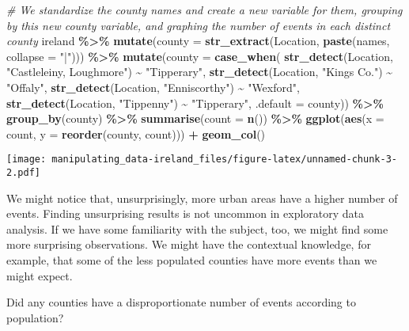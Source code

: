 \documentclass[
]{article}
\newenvironment{Shaded}{\begin{snugshade}}{\end{snugshade}}
\newcommand{\AttributeTok}[1]{\textcolor[rgb]{0.13,0.29,0.53}{#1}}
\newcommand{\CommentTok}[1]{\textcolor[rgb]{0.56,0.35,0.01}{\textit{#1}}}
\newcommand{\FunctionTok}[1]{\textcolor[rgb]{0.13,0.29,0.53}{\textbf{#1}}}
\newcommand{\NormalTok}[1]{#1}
\newcommand{\SpecialCharTok}[1]{\textcolor[rgb]{0.81,0.36,0.00}{\textbf{#1}}}
\newcommand{\StringTok}[1]{\textcolor[rgb]{0.31,0.60,0.02}{#1}}
\begin{document}
\begin{Shaded}
\begin{Highlighting}[]
\CommentTok{\# We standardize the county names and create a new variable for them, grouping by this new county variable, and graphing the number of events in each distinct county}
\NormalTok{ireland }\SpecialCharTok{\%\textgreater{}\%} 
  \FunctionTok{mutate}\NormalTok{(}\AttributeTok{county =} \FunctionTok{str\_extract}\NormalTok{(Location, }\FunctionTok{paste}\NormalTok{(names, }\AttributeTok{collapse =} \StringTok{"|"}\NormalTok{))) }\SpecialCharTok{\%\textgreater{}\%}
  \FunctionTok{mutate}\NormalTok{(}\AttributeTok{county =} \FunctionTok{case\_when}\NormalTok{(}
    \FunctionTok{str\_detect}\NormalTok{(Location, }\StringTok{"Castleleiny, Loughmore"}\NormalTok{) }\SpecialCharTok{\textasciitilde{}} \StringTok{"Tipperary"}\NormalTok{,}
    \FunctionTok{str\_detect}\NormalTok{(Location, }\StringTok{"King\textquotesingle{}s Co."}\NormalTok{) }\SpecialCharTok{\textasciitilde{}} \StringTok{"Offaly"}\NormalTok{,}
    \FunctionTok{str\_detect}\NormalTok{(Location, }\StringTok{"Enniscorthy"}\NormalTok{) }\SpecialCharTok{\textasciitilde{}} \StringTok{"Wexford"}\NormalTok{,}
    \FunctionTok{str\_detect}\NormalTok{(Location, }\StringTok{"Tippenny"}\NormalTok{) }\SpecialCharTok{\textasciitilde{}} \StringTok{"Tipperary"}\NormalTok{,}
    \AttributeTok{.default =}\NormalTok{ county)) }\SpecialCharTok{\%\textgreater{}\%}
  \FunctionTok{group\_by}\NormalTok{(county) }\SpecialCharTok{\%\textgreater{}\%}
  \FunctionTok{summarise}\NormalTok{(}\AttributeTok{count =} \FunctionTok{n}\NormalTok{()) }\SpecialCharTok{\%\textgreater{}\%}
  \FunctionTok{ggplot}\NormalTok{(}\FunctionTok{aes}\NormalTok{(}\AttributeTok{x =}\NormalTok{ count, }\AttributeTok{y =} \FunctionTok{reorder}\NormalTok{(county, count))) }\SpecialCharTok{+} 
    \FunctionTok{geom\_col}\NormalTok{()}
\end{Highlighting}
\end{Shaded}

\texttt{[image: manipulating\_data-ireland\_files/figure-latex/unnamed-chunk-3-2.pdf]}

We might notice that, unsurprisingly, more urban areas have a higher
number of events. Finding unsurprising results is not uncommon in
exploratory data analysis. If we have some familiarity with the subject,
too, we might find some more surprising observations. We might have the
contextual knowledge, for example, that some of the less populated
counties have more events than we might expect.

Did any counties have a disproportionate number of events according to
population?
\end{document}
